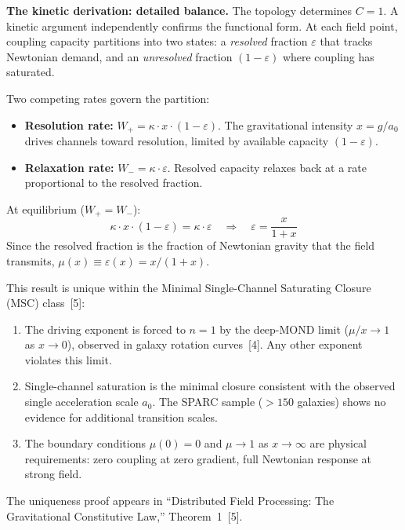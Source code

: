 \documentclass[11pt]{article}
\begin{document}

\textbf{The kinetic derivation: detailed balance.}\quad
The topology determines $C = 1$.
A kinetic argument independently confirms the functional form.
At each field point, coupling capacity partitions into two states: a \emph{resolved} fraction $\varepsilon$ that tracks Newtonian demand, and an \emph{unresolved} fraction $(1 - \varepsilon)$ where coupling has saturated.

Two competing rates govern the partition:
\begin{itemize}[nosep,leftmargin=2em]
\item \textbf{Resolution rate:} $W_+ = \kappa \cdot x \cdot (1 - \varepsilon)$.
The gravitational intensity $x = g/a_0$ drives channels toward resolution, limited by available capacity $(1 - \varepsilon)$.
\item \textbf{Relaxation rate:} $W_- = \kappa \cdot \varepsilon$.
Resolved capacity relaxes back at a rate proportional to the resolved fraction.
\end{itemize}
At equilibrium ($W_+ = W_-$):
\begin{equation}
\kappa \cdot x \cdot (1 - \varepsilon) = \kappa \cdot \varepsilon \quad\Longrightarrow\quad \varepsilon = \frac{x}{1+x}
\label{eq:detailed-balance}
\end{equation}
Since the resolved fraction is the fraction of Newtonian gravity that the field transmits, $\mu(x) \equiv \varepsilon(x) = x/(1+x)$.

This result is unique within the Minimal Single-Channel Saturating Closure (MSC) class~[5]:
\begin{enumerate}[nosep,leftmargin=2em]
\item The driving exponent is forced to $n = 1$ by the deep-MOND limit ($\mu/x \to 1$ as $x \to 0$), observed in galaxy rotation curves~[4].
Any other exponent violates this limit.
\item Single-channel saturation is the minimal closure consistent with the observed single acceleration scale $a_0$.
The SPARC sample ($> 150$ galaxies) shows no evidence for additional transition scales.
\item The boundary conditions $\mu(0) = 0$ and $\mu \to 1$ as $x \to \infty$ are physical requirements: zero coupling at zero gradient, full Newtonian response at strong field.
\end{enumerate}
The uniqueness proof appears in ``Distributed Field Processing: The Gravitational Constitutive Law,'' Theorem~1~[5].
\end{document}
